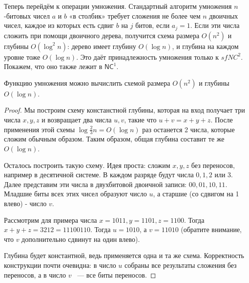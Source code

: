 Теперь перейдём к операции умножения. Стандартный алгоритм умножения
$n$-битовых чисел $a$ и $b$ «в столбик» требует сложения не более чем $n$ двоичных
чисел, каждое из которых есть сдвиг $b$ на $j$ битов, если $a_j=1$. Если эти числа сложить при помощи двоичного дерева, получится схема размера $O(n^2)$ и глубины $O(\log^2 n)$: дерево имеет глубину $O(\log n)$, и глубина на каждом уровне тоже $O(\log n)$. Это даёт принадлежность умножения только к $\mathsf{}sf{NC}^2$. Покажем, что оно также лежит в $\mathsf{NC}^1$.

\begin{theorem} Функцию умножения можно вычислить схемой размера $O(n^2)$ и глубины $O(\log n)$.  \end{theorem}

\begin{proof}

Мы построим схему констанстной глубины, которая на вход получает три числа $x, y, z$ и возвращает два числа $u,v$, такие что $u + v = x + y + z$. После применения этой схемы $\log{\frac{2}{3} n} = O(\log n)$ раз останется 2 числа, которые сложим обычным образом. Таким образом, общая глубина составит те же $O(\log n)$.

Осталось построить такую схему. Идея проста: сложим $x,y,z$ без переносов, например в десятичной системе. В каждом разряде будут числа $0,1,2$ или $3$. Далее представим эти числа в двухбитовой двоичной записи: $00, 01, 10, 11$. Младшие биты всех этих чисел образуют число $u$, а старшие (со сдвигом на 1 влево) - число $v$. 

Рассмотрим для примера числа $x=1011, y=1101, z=1100$. Тогда $x+y+z = 3212 = 11100110$. Тогда $u = 1010$, а $v = 11010$ (обратите внимание, что $v$ дополнительно сдвинут на один влево). 

Глубина будет константной, ведь применяется одна и та же схема. Корректность конструкции почти очевидна: в число $u$ собраны все результаты сложения без переносов, а в число $v$ ~--- все биты переносов. \end{proof}